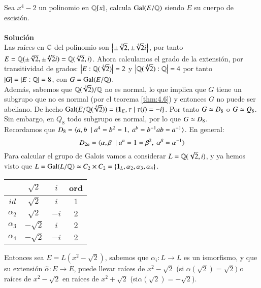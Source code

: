 \begin{eg}
    Sea $x^4-2$ un polinomio en $\mathbb{Q}[x]$, calcula $\mathrm{Gal}(E/\mathbb{Q})$ siendo $E$ su cuerpo de escisión.\\\\

    \textbf{Solución}\\
    Las raíces en $\mathbb{C}$ del polinomio son $\left\{\pm \sqrt[4]{2}, \pm \sqrt[4]{2} i\right\}$, por tanto $E = \mathbb{Q}(\pm \sqrt[4]{2}, \pm \sqrt[4]{2} i)  = \mathbb{Q}(\sqrt[4]{2}, i)$.
    Ahora calculamos el grado de la extensión, por transitividad de grados: $\left|E:\mathbb{Q}(\sqrt[4]{2})\right| = 2$ y $\left|\mathbb{Q}(\sqrt[4]{2}):\mathbb{Q}\right| = 4$ por tanto $\left|G\right| = \left|E:\mathbb{Q}\right| = 8$, con $G = \mathrm{Gal}(E/\mathbb{Q})$.\\

    Además, sabemos que $\mathbb{Q}(\sqrt[4]{2})/\mathbb{Q}$ no es normal, lo que implica que $G$ tiene un subgrupo que no es normal (por el teorema \ref{thm:4.6}) y entonces $G$ no puede ser abeliano. De hecho $\mathrm{Gal}(E/\mathbb{Q}(\sqrt[4]{2})) = \left\{\mathbf{1}_E, \tau \mid \tau(i) = -i\right\}$. Por tanto $G \simeq D_8$ o $G \simeq Q_8$.
    Sin embargo, en $Q_8$ todo subgrupo es normal, por lo que $G \simeq D_8$.\\

    Recordamos que $D_8 = \langle a, b\ \mid a^4 = b^2 = 1,\ a^b = b^{-1} a b = a^{-1}\rangle$. En general:
    $$
        D_{2n} = \langle\alpha, \beta\ \mid a^n = 1 = \beta^2,\ \alpha^\beta = \alpha^{-1}\rangle
    $$
    Para calcular el grupo de Galois vamos a considerar $L = \mathbb{Q}(\sqrt 2, i)$, y ya hemos visto que $L = \mathrm{Gal}(L/\mathbb{Q}) \simeq C_2 \times C_2 = \left\{\mathbf{1}_L, \alpha_2, \alpha_3, \alpha_4\right\}$.\\

    \begin{center}
        \begin{tabular}{|c||c|c|c|}
        \hline
                   & $\sqrt{2}$  & $i$  & ord \\ \hline \hline
        $id$       & $\sqrt{2}$  & $i$  & $1$ \\ \hline
        $\alpha_2$ & $\sqrt{2}$  & $-i$ & $2$ \\ \hline
        $\alpha_3$ & $-\sqrt{2}$ & $i$  & $2$ \\ \hline
        $\alpha_4$ & $-\sqrt{2}$ & $-i$ & $2$ \\ \hline
        \end{tabular}
    \end{center}

    Entonces sea $E = L(x^2-\sqrt{2})$, sabemos que $\alpha_i: L \to L$ es un ismorfismo, y que su extensión $\hat{\alpha}: E \to E$, puede llevar raíces de $x^2 - \sqrt{2}$ (si $\alpha(\sqrt 2) = \sqrt 2)$ o raíces de $x^2 - \sqrt{2}$ en raíces de $x^2 + \sqrt{2}$ (si$ \alpha(\sqrt 2) = -\sqrt 2$).\\


\end{eg}
